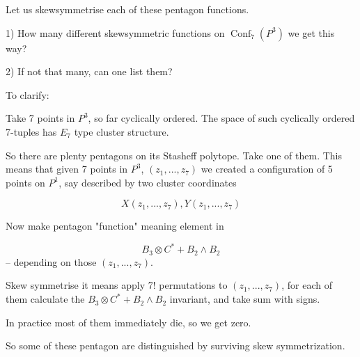 \documentclass[12pt]{article}
\DeclareMathOperator{\Conf}{Conf}
\begin{document}
\begin{enumerate}
Let us skewsymmetrise each of these pentagon functions.

1) How many different skewsymmetric functions on $\Conf_7(P^3)$ we get
this way?

2) If not that many, can one list them?

To clarify:

Take 7 points in $P^3$, so far cyclically ordered.
The space of such cyclically ordered 7-tuples has $E_7$ type cluster structure.

So there are plenty pentagons on its Stasheff polytope. Take one of them.
This means that given 7 points in $P^3$, $(z_1, ..., z_7)$
we created a configuration of 5 points on $P^1$, say described by two
cluster coordinates

$$
X(z_1, ..., z_7), Y(z_1, ..., z_7)
$$

Now make pentagon "function" meaning element in

$$
B_3 \otimes C^* + B_2 \wedge B_2
$$
-- depending on those $(z_1, ..., z_7)$.

Skew symmetrise it means apply 7! permutations to $(z_1, ..., z_7)$, for
each of them
calculate the
$B_3 \otimes C^* + B_2 \wedge B_2$ invariant, and take sum with signs.

In practice most of them immediately die, so we get zero.

So some of these pentagon are distinguished by surviving skew symmetrization.

\end{enumerate}
\end{document}
